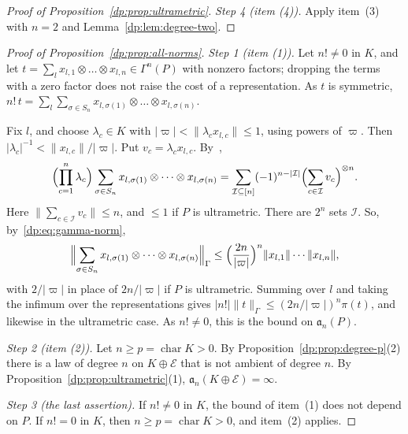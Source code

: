 \documentclass[11pt]{amsart}
\theoremstyle{definition}
\theoremstyle{remark}
\numberwithin{equation}{section}
\newcommand{\abs}[1]{\lvert #1\rvert}
\newcommand{\norm}[1]{\lVert #1\rVert}
\theoremstyle{plain}
\theoremstyle{definition}
\theoremstyle{plain}
\begin{document}
\begin{proof}[Proof of Proposition~\ref{dp:prop:ultrametric}]
\emph{Step 4 (item (4)).} Apply item~(3) with $n=2$ and Lemma~\ref{dp:lem:degree-two}.
\end{proof}

\begin{proof}[Proof of Proposition~\ref{dp:prop:all-norms}]
\emph{Step 1 (item (1)).} Let $n!\ne0$ in $K$, and let $t=\sum_lx_{l,1}\otimes\dots\otimes x_{l,n}\in\Gamma^n(P)$ with nonzero factors; dropping the terms with a zero factor does not raise the cost of a representation. As $t$ is symmetric, $n!\,t=\sum_l\sum_{\sigma\in S_n}x_{l,\sigma(1)}\otimes\dots\otimes x_{l,\sigma(n)}$.

Fix $l$, and choose $\lambda_c\in K$ with $\abs\varpi<\norm{\lambda_cx_{l,c}}\le1$, using powers of $\varpi$. Then $\abs{\lambda_c}^{-1}<\norm{x_{l,c}}/\abs\varpi$. Put $v_c=\lambda_cx_{l,c}$. By~\cite[(4.2)]{I},
\[
 \Bigl(\prod_{c=1}^n\lambda_c\Bigr)\sum_{\sigma\in S_n}x_{l,\sigma(1)}\otimes\dots\otimes x_{l,\sigma(n)}
 =\sum_{\mathcal I\subseteq[n]}(-1)^{n-\abs{\mathcal I}}\Bigl(\sum_{c\in\mathcal I}v_c\Bigr)^{\otimes n}.
\]
Here $\norm{\sum_{c\in\mathcal I}v_c}\le n$, and $\le1$ if $P$ is ultrametric. There are $2^n$ sets $\mathcal I$. So, by~\eqref{dp:eq:gamma-norm},
\[
 \Bigl\|\sum_{\sigma\in S_n}x_{l,\sigma(1)}\otimes\dots\otimes x_{l,\sigma(n)}\Bigr\|_\Gamma
 \le\Bigl(\frac{2n}{\abs\varpi}\Bigr)^n\norm{x_{l,1}}\cdots\norm{x_{l,n}},
\]
with $2/\abs\varpi$ in place of $2n/\abs\varpi$ if $P$ is ultrametric. Summing over $l$ and taking the infimum over the representations gives $\abs{n!}\norm t_\Gamma\le(2n/\abs\varpi)^n\pi(t)$, and likewise in the ultrametric case. As $n!\ne0$, this is the bound on $\mathfrak a_n(P)$.

\emph{Step 2 (item (2)).} Let $n\ge p=\operatorname{char}K>0$. By Proposition~\ref{dp:prop:degree-p}(2) there is a law of degree $n$ on $K\oplus\mathcal E$ that is not ambient of degree $n$. By Proposition~\ref{dp:prop:ultrametric}(1), $\mathfrak a_n(K\oplus\mathcal E)=\infty$.

\emph{Step 3 (the last assertion).} If $n!\ne0$ in $K$, the bound of item~(1) does not depend on $P$. If $n!=0$ in $K$, then $n\ge p=\operatorname{char}K>0$, and item~(2) applies.
\end{proof}
\end{document}
